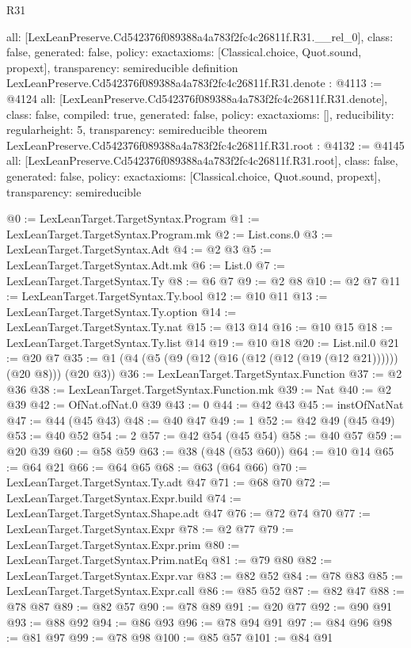\begin{lexlean}{R31}
\begin{coremodule}
{  all: [LexLeanPreserve.Cd542376f089388a4a783f2fc4c26811f.R31.__rel_0],
  class: false,
  generated: false,
  policy: exact{axioms: [Classical.choice, Quot.sound, propext]},
  transparency: semireducible
}
definition LexLeanPreserve.Cd542376f089388a4a783f2fc4c26811f.R31.denote : @4113 := @4124 {
  all: [LexLeanPreserve.Cd542376f089388a4a783f2fc4c26811f.R31.denote],
  class: false,
  compiled: true,
  generated: false,
  policy: exact{axioms: []},
  reducibility: regular{height: 5},
  transparency: semireducible
}
theorem LexLeanPreserve.Cd542376f089388a4a783f2fc4c26811f.R31.root : @4132 := @4145 {
  all: [LexLeanPreserve.Cd542376f089388a4a783f2fc4c26811f.R31.root],
  class: false,
  generated: false,
  policy: exact{axioms: [Classical.choice, Quot.sound, propext]},
  transparency: semireducible
}

@0 := LexLeanTarget.TargetSyntax.Program
@1 := LexLeanTarget.TargetSyntax.Program.mk
@2 := List.cons.{0}
@3 := LexLeanTarget.TargetSyntax.Adt
@4 := @2 @3
@5 := LexLeanTarget.TargetSyntax.Adt.mk
@6 := List.{0}
@7 := LexLeanTarget.TargetSyntax.Ty
@8 := @6 @7
@9 := @2 @8
@10 := @2 @7
@11 := LexLeanTarget.TargetSyntax.Ty.bool
@12 := @10 @11
@13 := LexLeanTarget.TargetSyntax.Ty.option
@14 := LexLeanTarget.TargetSyntax.Ty.nat
@15 := @13 @14
@16 := @10 @15
@18 := LexLeanTarget.TargetSyntax.Ty.list @14
@19 := @10 @18
@20 := List.nil.{0}
@21 := @20 @7
@35 := @1 (@4 (@5 (@9 (@12 (@16 (@12 (@12 (@19 (@12 @21)))))) (@20 @8))) (@20 @3))
@36 := LexLeanTarget.TargetSyntax.Function
@37 := @2 @36
@38 := LexLeanTarget.TargetSyntax.Function.mk
@39 := Nat
@40 := @2 @39
@42 := OfNat.ofNat.{0} @39
@43 := 0
@44 := @42 @43
@45 := instOfNatNat
@47 := @44 (@45 @43)
@48 := @40 @47
@49 := 1
@52 := @42 @49 (@45 @49)
@53 := @40 @52
@54 := 2
@57 := @42 @54 (@45 @54)
@58 := @40 @57
@59 := @20 @39
@60 := @58 @59
@63 := @38 (@48 (@53 @60))
@64 := @10 @14
@65 := @64 @21
@66 := @64 @65
@68 := @63 (@64 @66)
@70 := LexLeanTarget.TargetSyntax.Ty.adt @47
@71 := @68 @70
@72 := LexLeanTarget.TargetSyntax.Expr.build
@74 := LexLeanTarget.TargetSyntax.Shape.adt @47
@76 := @72 @74 @70
@77 := LexLeanTarget.TargetSyntax.Expr
@78 := @2 @77
@79 := LexLeanTarget.TargetSyntax.Expr.prim
@80 := LexLeanTarget.TargetSyntax.Prim.natEq
@81 := @79 @80
@82 := LexLeanTarget.TargetSyntax.Expr.var
@83 := @82 @52
@84 := @78 @83
@85 := LexLeanTarget.TargetSyntax.Expr.call
@86 := @85 @52
@87 := @82 @47
@88 := @78 @87
@89 := @82 @57
@90 := @78 @89
@91 := @20 @77
@92 := @90 @91
@93 := @88 @92
@94 := @86 @93
@96 := @78 @94 @91
@97 := @84 @96
@98 := @81 @97
@99 := @78 @98
@100 := @85 @57
@101 := @84 @91

\end{coremodule}
\end{lexlean}
